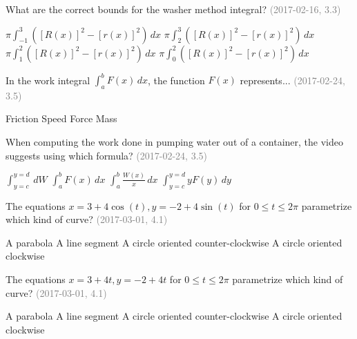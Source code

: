 \documentclass[12pt]{exam}
\newcommand{\questionDate}[1]{\textcolor{gray}{(#1)}}
\newcommand{\<}{\langle}
\renewcommand{\>}{\rangle}
\begin{document}
\begin{questions}
  \question
   What are the correct bounds for the washer method integral?
  \questionDate{2017-02-16, 3.3}
  \begin{choices}
    \choice
      \(\pi\int_{-1}^3([R(x)]^2-[r(x)]^2)\,dx\)
    \choice
      \(\pi\int_2^3([R(x)]^2-[r(x)]^2)\,dx\)
    \CorrectChoice
      \(\pi\int_1^2([R(x)]^2-[r(x)]^2)\,dx\)
    \choice
      \(\pi\int_0^2([R(x)]^2-[r(x)]^2)\,dx\)
  \end{choices}

\newpage

  \question
  In the work integral \(\int_a^b F(x)\,dx\), the function \(F(x)\)
  represents...
  \questionDate{2017-02-24, 3.5}
  \begin{choices}
    \choice
      Friction
    \choice
      Speed
    \CorrectChoice
      Force
    \choice
      Mass
  \end{choices}

  \question
  When computing the work done in pumping water out of a container,
  the video suggests using which formula?
  \questionDate{2017-02-24, 3.5}
  \begin{choices}
    \CorrectChoice
      \(\int_{y=c}^{y=d}\,dW\)
    \choice
      \(\int_a^b F(x)\,dx\)
    \choice
      \(\int_a^b \frac{W(x)}{x}\,dx\)
    \choice
      \(\int_{y=c}^{y=d}yF(y)\,dy\)
  \end{choices}

\newpage

  \question
  The equations \(x=3+4\cos(t),y=-2+4\sin(t)\) for \(0\leq t\leq 2\pi\)
  parametrize which kind of curve?
  \questionDate{2017-03-01, 4.1}
  \begin{choices}
    \choice
      A parabola
    \choice
      A line segment
    \CorrectChoice
      A circle oriented counter-clockwise
    \choice
      A circle oriented clockwise
  \end{choices}

  \question
  The equations \(x=3+4t,y=-2+4t\) for \(0\leq t\leq 2\pi\)
  parametrize which kind of curve?
  \questionDate{2017-03-01, 4.1}
  \begin{choices}
    \choice
      A parabola
    \choice
      A line segment
    \CorrectChoice
      A circle oriented counter-clockwise
    \choice
      A circle oriented clockwise
  \end{choices}


\end{questions}
\end{document}
